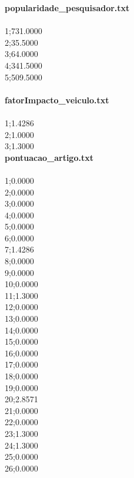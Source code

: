 \documentclass[12pt, a4paper]{article}
\begin{document}
\begin{multicols}{2}
  \textbf{popularidade\_pesquisador.txt}\\\\
  1;731.0000\\
  2;35.5000\\
  3;64.0000\\
  4;341.5000\\
  5;509.5000\\\\

  \textbf{fatorImpacto\_veiculo.txt}\\\\
  1;1.4286\\
  2;1.0000\\
  3;1.3000\\

  \textbf{pontuacao\_artigo.txt}\\\\
  1;0.0000\\
  2;0.0000\\
  3;0.0000\\
  4;0.0000\\
  5;0.0000\\
  6;0.0000\\
  7;1.4286\\
  8;0.0000\\
  9;0.0000\\
  10;0.0000\\
  11;1.3000\\
  12;0.0000\\
  13;0.0000\\
  14;0.0000\\
  15;0.0000\\
  16;0.0000\\
  17;0.0000\\
  18;0.0000\\
  19;0.0000\\
  20;2.8571\\
  21;0.0000\\
  22;0.0000\\
  23;1.3000\\
  24;1.3000\\
  25;0.0000\\
  26;0.0000\\\\

  \end{multicols}

\end{document}
